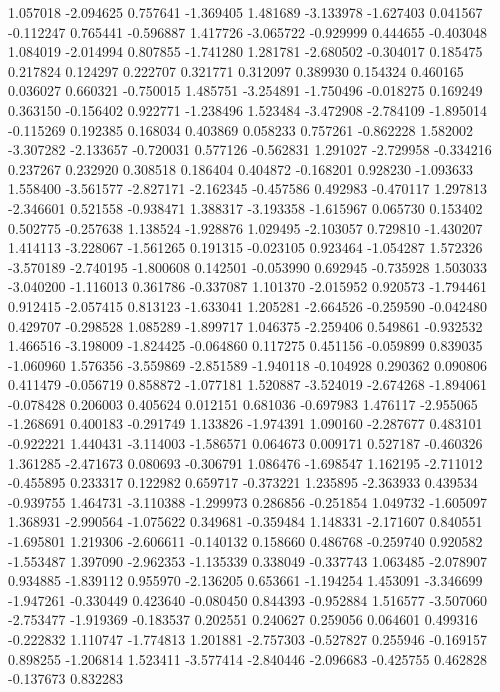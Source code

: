 1.057018
-2.094625
0.757641
-1.369405
1.481689
-3.133978
-1.627403
0.041567
-0.112247
0.765441
-0.596887
1.417726
-3.065722
-0.929999
0.444655
-0.403048
1.084019
-2.014994
0.807855
-1.741280
1.281781
-2.680502
-0.304017
0.185475
0.217824
0.124297
0.222707
0.321771
0.312097
0.389930
0.154324
0.460165
0.036027
0.660321
-0.750015
1.485751
-3.254891
-1.750496
-0.018275
0.169249
0.363150
-0.156402
0.922771
-1.238496
1.523484
-3.472908
-2.784109
-1.895014
-0.115269
0.192385
0.168034
0.403869
0.058233
0.757261
-0.862228
1.582002
-3.307282
-2.133657
-0.720031
0.577126
-0.562831
1.291027
-2.729958
-0.334216
0.237267
0.232920
0.308518
0.186404
0.404872
-0.168201
0.928230
-1.093633
1.558400
-3.561577
-2.827171
-2.162345
-0.457586
0.492983
-0.470117
1.297813
-2.346601
0.521558
-0.938471
1.388317
-3.193358
-1.615967
0.065730
0.153402
0.502775
-0.257638
1.138524
-1.928876
1.029495
-2.103057
0.729810
-1.430207
1.414113
-3.228067
-1.561265
0.191315
-0.023105
0.923464
-1.054287
1.572326
-3.570189
-2.740195
-1.800608
0.142501
-0.053990
0.692945
-0.735928
1.503033
-3.040200
-1.116013
0.361786
-0.337087
1.101370
-2.015952
0.920573
-1.794461
0.912415
-2.057415
0.813123
-1.633041
1.205281
-2.664526
-0.259590
-0.042480
0.429707
-0.298528
1.085289
-1.899717
1.046375
-2.259406
0.549861
-0.932532
1.466516
-3.198009
-1.824425
-0.064860
0.117275
0.451156
-0.059899
0.839035
-1.060960
1.576356
-3.559869
-2.851589
-1.940118
-0.104928
0.290362
0.090806
0.411479
-0.056719
0.858872
-1.077181
1.520887
-3.524019
-2.674268
-1.894061
-0.078428
0.206003
0.405624
0.012151
0.681036
-0.697983
1.476117
-2.955065
-1.268691
0.400183
-0.291749
1.133826
-1.974391
1.090160
-2.287677
0.483101
-0.922221
1.440431
-3.114003
-1.586571
0.064673
0.009171
0.527187
-0.460326
1.361285
-2.471673
0.080693
-0.306791
1.086476
-1.698547
1.162195
-2.711012
-0.455895
0.233317
0.122982
0.659717
-0.373221
1.235895
-2.363933
0.439534
-0.939755
1.464731
-3.110388
-1.299973
0.286856
-0.251854
1.049732
-1.605097
1.368931
-2.990564
-1.075622
0.349681
-0.359484
1.148331
-2.171607
0.840551
-1.695801
1.219306
-2.606611
-0.140132
0.158660
0.486768
-0.259740
0.920582
-1.553487
1.397090
-2.962353
-1.135339
0.338049
-0.337743
1.063485
-2.078907
0.934885
-1.839112
0.955970
-2.136205
0.653661
-1.194254
1.453091
-3.346699
-1.947261
-0.330449
0.423640
-0.080450
0.844393
-0.952884
1.516577
-3.507060
-2.753477
-1.919369
-0.183537
0.202551
0.240627
0.259056
0.064601
0.499316
-0.222832
1.110747
-1.774813
1.201881
-2.757303
-0.527827
0.255946
-0.169157
0.898255
-1.206814
1.523411
-3.577414
-2.840446
-2.096683
-0.425755
0.462828
-0.137673
0.832283
